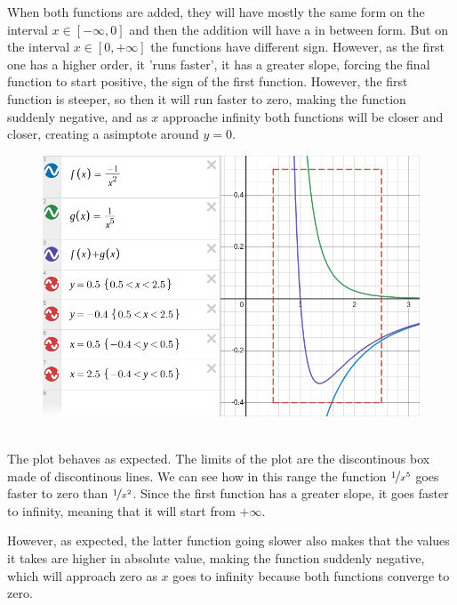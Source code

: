 \documentclass{report}
\begin{document}
  \noindent When both functions are added, they will have mostly the same form on the interval $x\in[-\infty,0]$ and then the addition will have a in between form. But on the interval $x\in[0,+\infty]$ the functions have different sign. However, as the first one has a higher order, it 'runs faster', it has a greater slope, forcing the final function to start positive, the sign of the first function. However, the first function is steeper, so then it will run faster to zero, making the function suddenly negative, and as $x$ approache infinity both functions will be closer and closer, creating a asimptote around $y=0$. 

  \begin{figure}
    \vspace{-0.2cm}
    \centering
    \includegraphics[width=\textwidth]{fotos/Screenshot from 2024-02-20 11-46-43.png}
  \end{figure}

  \hspace{0cm}\\
  \noindent The plot behaves as expected. The limits of the plot are the discontinous box made of discontinous lines. We can see how in this range the function $\nicefrac{1}{x^5}$ goes faster to zero than $\nicefrac{1}{x^2}$. Since the first function has a greater slope, it goes faster to infinity, meaning that it will start from $+\infty$.
  
  \vspace{0.4cm}\noindent However, as expected, the latter function going slower also makes that the values it takes are higher in absolute value, making the function suddenly negative, which will approach zero as $x$ goes to infinity because both functions converge to zero.
\end{document}
